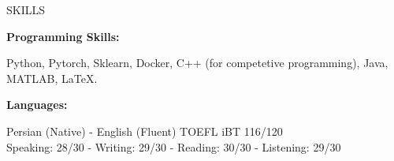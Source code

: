 \documentclass{resume} %
\begin{document}
\begin{rSection}{SKILLS}
\begin{minipage}[t]{3.2in}
\begin{center}
{\bf Programming Skills:} 

\begin{footnotesize} Python, Pytorch, Sklearn, Docker, C++ (for competetive programming), Java, MATLAB, \LaTeX. \end{footnotesize}
\end{center}
\end{minipage}
\hspace{0cm}
\begin{minipage}[t]{4in}
\begin{center}
{\bf Languages:}\\
\vspace{0.2cm}
\begin{footnotesize} Persian (Native) - English (Fluent) TOEFL iBT 116/120\\ Speaking: 28/30 - Writing: 29/30 - Reading: 30/30 - Listening: 29/30 
\end{footnotesize}
\end{center}
\end{minipage}
\end{rSection}
\end{document}
